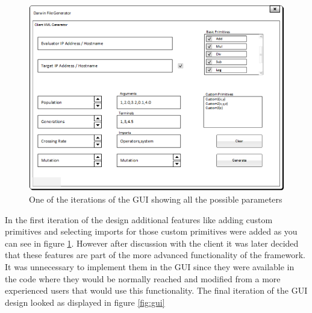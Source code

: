 \begin{figure}[htp]
\centering
\includegraphics[scale=0.6]{Figures/guiit.png}
\caption{One of the iterations of the GUI showing all the possible parameters}
\label{fig:guiit}
\end{figure}

In the first iteration of the design additional features like adding custom primitives and selecting imports
for those custom primitives were added as you can see in figure \ref{fig:guiit}. However after discussion with the client it was later
decided that these features are part of the more advanced functionality of the framework. It was unnecessary to implement them in the GUI
 since they were available in the code where they would be 
normally reached and modified from a more experienced users that would use this functionality. The final iteration of the GUI design
 looked as displayed in figure \ref{fig:gui}